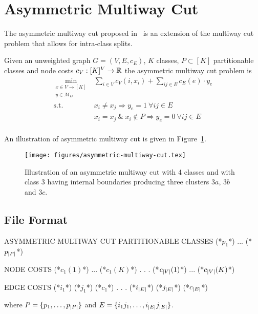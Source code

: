 \section{Asymmetric Multiway Cut}
The asymmetric multiway cut proposed in~\cite{kroeger2014asymmetric} is an extension of the multiway cut problem that allows for intra-class splits.

\begin{definition}
Given an unweighted graph $G=(V,E,c_E)$, $K$ classes, $P \subset [K]$ partitionable classes and node costs $c_V : [K]^V \rightarrow \mathbb{R}$ the asymmetric multiway cut problem is
\begin{equation}
    \begin{array}{rl}
    \min\limits_{\substack{x \in V \rightarrow [K]\\ y \in \mathcal{M}_G}}
    & \sum_{i \in V} c_V(i,x_i) + \sum_{ij \in E} c_E(e) \cdot y_e \\
    \text{s.t.}
    & x_i \neq x_j \Rightarrow y_e = 1\ \forall ij \in E \\
    & x_i = x_j \ \&\ x_i \notin P \Rightarrow y_e = 0\ \forall ij \in E \\
    \end{array}
\end{equation}
\end{definition}

An illustration of asymmetric multiway cut is given in Figure~\ref{fig:asymmetric-multiway-cut}.

\begin{figure}[H]
    \begin{center}
        \texttt{[image: figures/asymmetric-multiway-cut.tex]}
    \end{center}
    \caption{Illustration of an asymmetric multiway cut with 4 classes and with class 3 having internal boundaries producing three clusters $3a$, $3b$ and $3c$.}
    \label{fig:asymmetric-multiway-cut}
\end{figure}

\subsection{File Format}

\begin{fileformat}
ASYMMETRIC MULTIWAY CUT
PARTITIONABLE CLASSES
(*$p_1$*) ... (*$p_{\lvert P\rvert}$*)

NODE COSTS
(*$c_1(1)$*) ... (*$c_1(K)$*) 
.
.
.
(*$c_{\lvert V\rvert}(1)$*) ... (*$c_{\lvert V\rvert}(K)$*)  

EDGE COSTS
(*$i_1$*) (*$j_1$*) (*$c_1$*)
.
.
.
(*$i_{\lvert E\rvert}$*) (*$j_{\lvert E\rvert}$*) (*$c_{\lvert E\rvert}$*)
\end{fileformat}
where $P = \{p_1,\ldots,p_{\lvert P\rvert}\}$ and
$E = \{i_1 j_1,\ldots,i_{\lvert E\rvert} j_{\lvert E\rvert}\}$.

